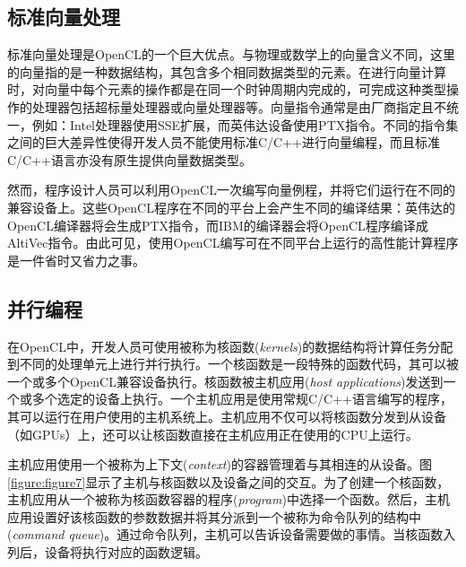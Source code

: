 \subsection{标准向量处理}

标准向量处理是OpenCL的一个巨大优点。与物理或数学上的向量含义不同，这里的向量指的是一种数据结构，其包含多个相同数据类型的元素。在进行向量计算时，对向量中每个元素的操作都是在同一个时钟周期内完成的，可完成这种类型操作的处理器包括超标量处理器或向量处理器等。向量指令通常是由厂商指定且不统一，例如：Intel处理器使用SSE扩展，而英伟达设备使用PTX指令。不同的指令集之间的巨大差异性使得开发人员不能使用标准C/C++进行向量编程，而且标准C/C++语言亦没有原生提供向量数据类型。

然而，程序设计人员可以利用OpenCL一次编写向量例程，并将它们运行在不同的兼容设备上。这些OpenCL程序在不同的平台上会产生不同的编译结果：英伟达的OpenCL编译器将会生成PTX指令，而IBM的编译器会将OpenCL程序编译成AltiVec指令。由此可见，使用OpenCL编写可在不同平台上运行的高性能计算程序是一件省时又省力之事。

\subsection{并行编程}

在OpenCL中，开发人员可使用被称为核函数(\emph{kernels})的数据结构将计算任务分配到不同的处理单元上进行并行执行。一个核函数是一段特殊的函数代码，其可以被一个或多个OpenCL兼容设备执行。核函数被主机应用(\emph{host applications})发送到一个或多个选定的设备上执行。一个主机应用是使用常规C/C++语言编写的程序，其可以运行在用户使用的主机系统上。主机应用不仅可以将核函数分发到从设备（如GPUs）上，还可以让核函数直接在主机应用正在使用的CPU上运行。

主机应用使用一个被称为上下文(\emph{context})的容器管理着与其相连的从设备。图\ref{figure:figure7}显示了主机与核函数以及设备之间的交互。为了创建一个核函数，主机应用从一个被称为核函数容器的程序(\emph{program})中选择一个函数。然后，主机应用设置好该核函数的参数数据并将其分派到一个被称为命令队列的结构中(\emph{command queue})。通过命令队列，主机可以告诉设备需要做的事情。当核函数入列后，设备将执行对应的函数逻辑。


